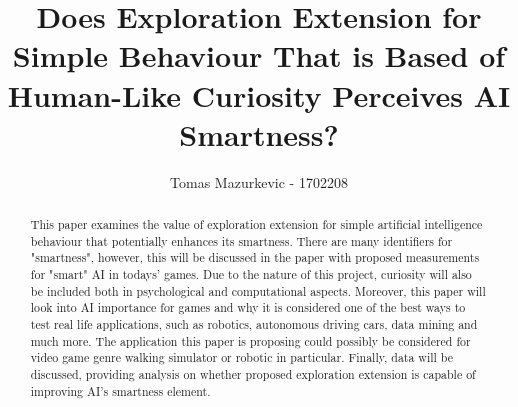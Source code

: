 \documentclass[journal]{IEEEtran}
\begin{document}
%
\title{Does Exploration Extension for Simple Behaviour That is Based of Human-Like Curiosity Perceives AI Smartness?}
%
%
\author{Tomas Mazurkevic - 1702208}


\maketitle

\begin{abstract}
This paper examines the value of exploration extension for simple artificial intelligence behaviour that potentially enhances its smartness. There are many identifiers for "smartness", however, this will be discussed in the paper with proposed measurements for "smart" AI in todays' games. Due to the nature of this project, curiosity will also be included both in psychological and computational aspects. Moreover, this paper will look into AI importance for games and why it is considered one of the best ways to test real life applications, such as robotics, autonomous driving cars, data mining and much more. The application this paper is proposing could possibly be considered for video game genre walking simulator or robotic in particular. Finally, data will be discussed, providing analysis on whether proposed exploration extension is capable of improving AI's smartness element.
\end{abstract}
\end{document}

